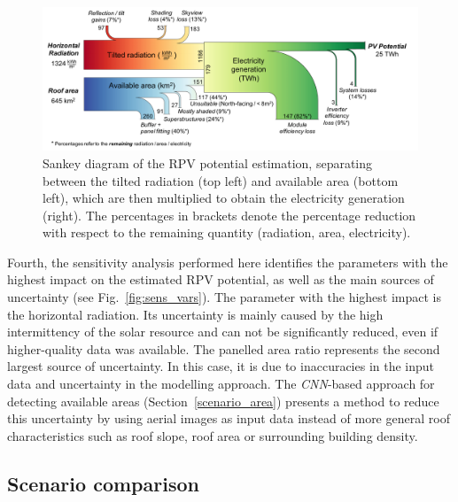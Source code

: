 \begin{figure}[tb]
\centering
\includegraphics[width=\linewidth]{images/Figs/solar_sankey_V2.pdf}
\caption{Sankey diagram of the RPV potential estimation, separating between the tilted radiation (top left) and available area (bottom left), which are then multiplied to obtain the electricity generation (right). The percentages in brackets denote the percentage reduction with respect to the remaining quantity (radiation, area, electricity).}
\label{fig:PV_sankey}
\end{figure}


Fourth, the sensitivity analysis performed here identifies the parameters with the highest impact on the estimated RPV potential, as well as the main sources of uncertainty (see Fig.~\ref{fig:sens_vars}). The parameter with the highest impact is the horizontal radiation. Its uncertainty is mainly caused by the high intermittency of the solar resource and can not be significantly reduced, even if higher-quality data was available. 
The panelled area ratio represents the second largest source of uncertainty. In this case, it is due to inaccuracies in the input data and uncertainty in the modelling approach. 
The \textit{CNN}-based approach for detecting available areas (Section~\ref{scenario_area}) presents a method to reduce this uncertainty by using aerial images as input data instead of more general roof characteristics such as roof slope, roof area or surrounding building density.


\subsection{Scenario comparison}
\label{scenario_compare}

